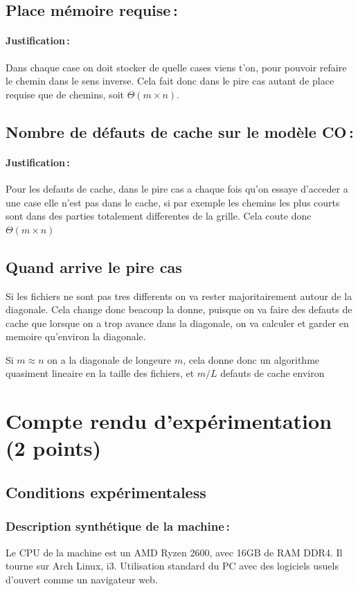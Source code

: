 \documentclass[a4paper,10pt,french]{article}
\begin{document}
  \subsection{Place mémoire requise\,: }
    \paragraph{Justification\,: }
	Dans chaque case on doit stocker de quelle cases viens t'on, pour pouvoir refaire le chemin dans le sens inverse. Cela fait donc dans le pire cas autant de place requise que de chemins, soit $\Theta(m\times n)$.
  \subsection{Nombre de défauts de cache sur le modèle CO\,: }
    \paragraph{Justification\,: }
	Pour les defauts de cache, dans le pire cas a chaque fois qu'on essaye d'acceder a une case elle n'est pas dans le cache, si par exemple les chemins les plus courts sont dans des parties totalement differentes de la grille. Cela coute donc $\Theta(m\times n)$

	\subsection{Quand arrive le pire cas}
{
	Si les fichiers ne sont pas tres differents on va rester majoritairement autour de la diagonale. Cela change donc beacoup la donne, puisque on va faire des defauts de cache que lorsque on a trop avance dans la diagonale, on va calculer et garder en memoire qu'environ la diagonale.

	Si $m\approx n$ on a la diagonale de longeure $m$, cela donne donc un algorithme quasiment lineaire en la taille des fichiers, et $m/L$ defauts de cache environ
}


\section{Compte rendu d'expérimentation (2 points)}
  \subsection{Conditions expérimentaless}

    \subsubsection{Description synthétique de la machine\,:}
	Le CPU de la machine est un AMD Ryzen 2600, avec 16GB de RAM DDR4. Il tourne sur Arch Linux, i3. Utilisation standard du PC avec des logiciels usuels d'ouvert comme un navigateur web.
\end{document}
